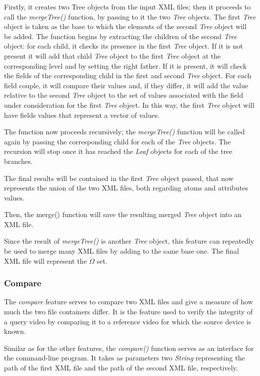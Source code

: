 Firstly, it creates two Tree objects from the input XML files; then it proceeds to call the \emph{mergeTree()} function, by passing to it the two \emph{Tree} objects. The first \emph{Tree} object is taken as the base to which the elements of the second \emph{Tree} object will be added. The function begins by extracting the children of the second \emph{Tree} object: for each child, it checks its presence in the first \emph{Tree} object.
If it is not present it will add that child \emph{Tree} object to the first \emph{Tree} object at the corresponding level and by setting the right father.
If it is present, it will check the fields of the corresponding child in the first and second \emph{Tree} object. For each field couple, it will compare their values and, if they differ, it will add the value relative to the second \emph{Tree} object to the set of values associated with the field under consideration for the first \emph{Tree} object. In this way, the first \emph{Tree} object will have fields values that represent a vector of values.

The function now proceeds recursively; the \emph{mergeTree()} function will be called again by passing the corresponding child for each of the \emph{Tree} objects. The recursion will stop once it has reached the \emph{Leaf} objects for each of the tree branches.

The final results will be contained in the first \emph{Tree} object passed, that now represents the union of the two XML files, both regarding atoms and attributes values.

Then, the merge() function will save the resulting merged \emph{Tree} object into an XML file.

Since the result of \emph{mergeTree()} is another \emph{Tree} object, this feature can repeatedly be used to merge many XML files by adding to the same base one. The final XML file will represent the $\Omega$ set.

\subsubsection*{Compare}

The \emph{compare} feature serves to compare two XML files and give a measure of how much the two file containers differ. It is the feature used to verify the integrity of a query video by comparing it to a reference video for which the source device is known.

Similar as for the other features, the \emph{compare()} function serves as an interface for the command-line program. It takes as parameters two \emph{String} representing the path of the first XML file and the path of the second XML file, respectively.

